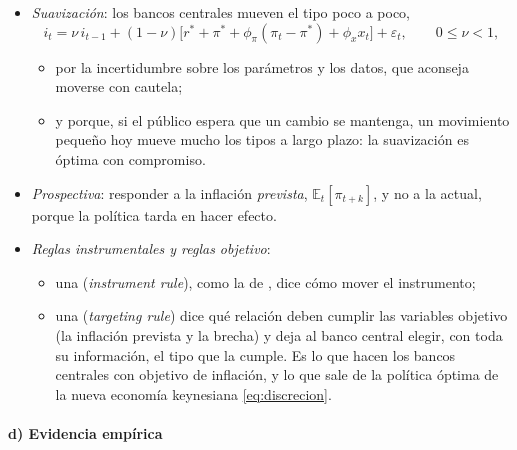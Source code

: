\documentclass[11pt]{article}
\begin{document}
\begin{itemize}
\item \emph{Suavización}: los bancos centrales mueven el tipo poco a poco,
  $$i_t=\nu\,i_{t-1}+(1-\nu)\big[r^*+\pi^*+\phi_\pi(\pi_t-\pi^*)+\phi_x x_t\big]+\varepsilon_t,\qquad 0\leq\nu<1 ,$$
  \begin{itemize}
  \item por la incertidumbre sobre los parámetros y los datos, que aconseja moverse con cautela\nocite{Brainard1967Uncertainty,Sack2000Does};
  \item y porque, si el público espera que un cambio se mantenga, un movimiento pequeño hoy mueve mucho los tipos a largo plazo: la suavización es óptima con compromiso\nocite{Woodford2003Optimal}.
  \end{itemize}
\item \emph{Prospectiva}: responder a la inflación \emph{prevista}, $\mathbb{E}_t[\pi_{t+k}]$, y no a la actual, porque la política tarda en hacer efecto\nocite{ClaridaGaliGertler2000Rules}.
\item \emph{Reglas instrumentales y reglas objetivo}\nocite{Svensson2003What}:
  \begin{itemize}
  \item una  (\emph{instrument rule}), como la de , dice cómo mover el instrumento;
  \item una  (\emph{targeting rule}) dice qué relación deben cumplir las variables objetivo (la inflación prevista y la brecha) y deja al banco central elegir, con toda su información, el tipo que la cumple. Es lo que hacen los bancos centrales con objetivo de inflación, y lo que sale de la política óptima de la nueva economía keynesiana \eqref{eq:discrecion}.
  \end{itemize}
\end{itemize}

\paragraph{d) Evidencia empírica}
\end{document}
